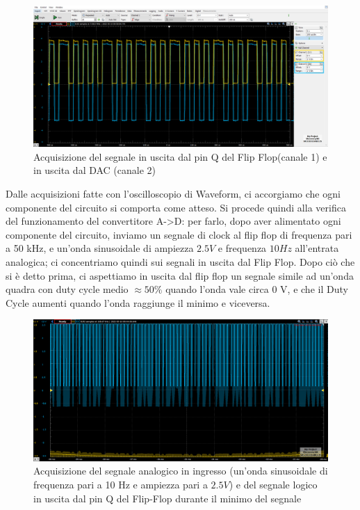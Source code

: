 \documentclass[10pt, a4paper, italian]{article}
\begin{document}
\begin{figure}[htbp]
    \centering
	\includegraphics[width=\textwidth]{MIDDLE.U3vU4}
    \caption{Acquisizione del segnale in uscita dal pin Q del Flip Flop(canale 1) e in uscita dal DAC (canale 2)}
\end{figure}
Dalle acquisizioni fatte con l'oscilloscopio di Waveform, ci accorgiamo che ogni componente del circuito si comporta come atteso.
Si procede quindi alla verifica del funzionamento del convertitore A->D: per farlo, dopo aver alimentato ogni componente del circuito, inviamo un segnale di clock al flip flop di frequenza pari a 50 kHz, e un'onda sinusoidale di ampiezza $2.5 V$ e frequenza $10 Hz$ all'entrata analogica; ci concentriamo quindi sui segnali in uscita dal Flip Flop.
Dopo ciò che si è detto prima, ci aspettiamo in uscita dal flip flop un segnale simile ad un'onda quadra con duty cycle medio $\approx 50 \percent$ quando l'onda vale circa 0 V, e che il Duty Cycle aumenti quando l'onda raggiunge il minimo e viceversa.
\begin{figure}[htbp]
    \centering
	\includegraphics[width=\textwidth]{BOTTOM}
    \caption{Acquisizione del segnale analogico in ingresso (un'onda sinusoidale di frequenza pari a 10 Hz e ampiezza pari a $2.5 V$) e del segnale logico in uscita dal pin Q del Flip-Flop durante il minimo del segnale}
\end{figure}
\end{document}
